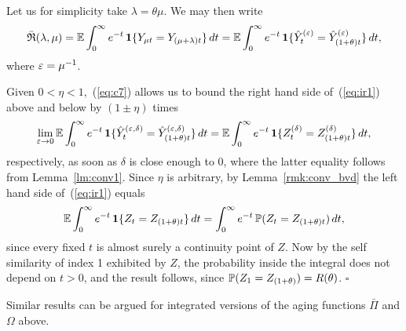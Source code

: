 
Let us for simplicity take $\lambda=\theta\mu$.
We may then write
\begin{equation}
\label{eq:ir1}
\bar{\mathfrak R}(\lambda,\mu)
=\esp\int_0^{\infty}e^{-t}\,{\mathbf 1}\{Y_{\mu t}=Y_{(\mu+\lambda) t}\}\,dt
=\esp\int_0^{\infty}e^{-t}\,{\mathbf 1}\{\hye_t=\hye_{(1+\theta)t}\}\,dt,
\end{equation}
where $\eps=\mu^{-1}$.


Given $0<\eta<1$,~(\ref{eq:c7}) allows us to bound the right hand side of~(\ref{eq:ir1}) above and below by $(1\pm\eta)$ times
\begin{equation}
\label{eq:ir2}
\lim_{\eps\to0}\esp\int_0^{\infty}e^{-t}\,{\mathbf 1}\{\byed_t=\byed_{(1+\theta)t}\}\,dt
=\esp\int_0^{\infty}e^{-t}\,{\mathbf 1}\{Z^{(\delta)}_t=Z^{(\delta)}_{(1+\theta)t}\}\,dt,
\end{equation}
respectively, as soon as $\delta$ is close enough to $0$, where the latter equality follows from Lemma~\ref{lm:conv1}. 
Since $\eta$ is arbitrary, by Lemma~\ref{rmk:conv_bvd} the left hand side of~(\ref{eq:ir1}) equals
\begin{equation}
\label{eq:ir3}
\esp\int_0^{\infty}e^{-t}\,{\mathbf 1}\{Z_t=Z_{(1+\theta)t}\}\,dt=\int_0^{\infty}e^{-t}\,\P(Z_t=Z_{(1+\theta)t})\,dt,
\end{equation}
since every fixed $t$ is almost surely a continuity point of $Z$. Now by the self similarity of index 1 exhibited by $Z$, 
the probability inside the integral does not depend on $t>0$, and the result follows, since
$\P(Z_1=Z_{(1+\theta)})=R(\theta)$. $\square$

\medskip

Similar results can be argued for integrated versions of the aging functions $\bar\Pi$ and $\Omega$ above.
























